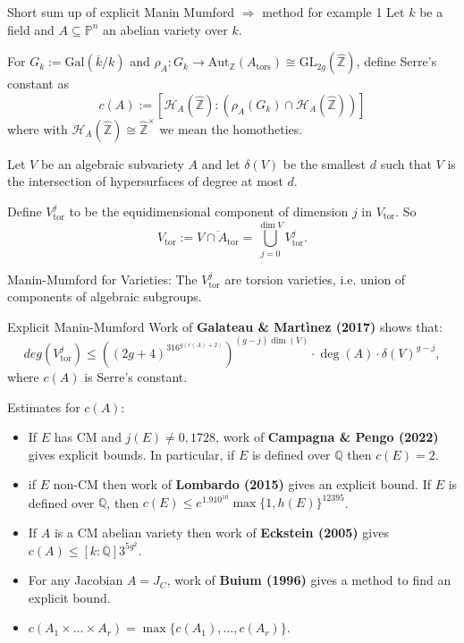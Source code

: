 \documentclass[12pt]{beamer}
\begin{document}
\begin{frame}{Short sum up of explicit Manin Mumford $\Longrightarrow$ method for example 1}
Let $k$ be a field and $A \subseteq \mathbb{P}^n$ an abelian variety over $k$.

\pause
\vspace{0.5cm}
For $G_k := \mathrm{Gal}(\overline{k}/k)$ and $\rho_A \colon G_k \to \mathrm{Aut}_\mathbb{Z}(A_\text{tors}) \cong \mathrm{GL}_{2 g}(\widehat{\mathbb{Z}})$, define Serre's constant as 
\begin{equation*} \label{eq:Serre_constant}
	c(A) := [\mathcal{H}_A(\widehat{\mathbb{Z}}) \colon (\rho_A(G_k) \cap \mathcal{H}_A(\widehat{\mathbb{Z}}))]
\end{equation*} where with $\mathcal{H}_A(\widehat{\mathbb{Z}}) \cong \widehat{\mathbb{Z}}^\times$ we mean the homotheties.

\pause
\vspace{0.5cm}
  Let  $V$ be an algebraic subvariety $A$ and let
 $\delta(V)$  be the smallest $d$ such that $V$ is the intersection of hypersurfaces of degree at most $d$. 
 
 Define $V^j_\text{tor}$ to be  the equidimensional component of dimension $j$ in $V_\text{tor}$. So
 $$V_\text{tor} := \overline{V \cap A_{\text{tor}}} = \bigcup_{j=0}^{\dim V} V_{\text{tor}}^j.$$
 
 Manin-Mumford for Varieties: The $V_{\text{tor}}^j$ are torsion varieties, i.e.  union of components of algebraic subgroups. 
\end{frame}


\begin{frame}{ Explicit Manin-Mumford}
 Work of \textbf{Galateau \& Mart\`inez (2017)} shows that:
  $$ deg(V_{\text{tor}}^j) \le ((2g+4)^316^{g (c(A) + 2)})^{(g-j) \dim(V)} \cdot \deg(A) \cdot \delta(V)^{g-j},$$ where $c(A)$ is Serre's constant.

\pause
\vspace{0.5cm}
Estimates for $c(A)$:
\begin{itemize}
\item If $E$ has CM and $j(E) \neq 0,1728$, work of \textbf{Campagna \& Pengo (2022)} gives explicit bounds. \newline In particular, if $E$ is defined over $\mathbb{Q}$ then
 $c(E)= 2$. 
\item if $E$ non-CM then work of \textbf{Lombardo (2015)} gives an explicit bound. \newline If $E$ is defined over $\mathbb{Q}$, then
$c(E) \le e^{1.9 10^{10}} \max\{1,h(E)\}^{12395}$.\pause
\item If $A$ is a CM abelian variety then work of \textbf{Eckstein (2005)} gives  $c(A)\le [k: \mathbb{Q}]3^{5g^2}$. \pause 
\item For any Jacobian  $A=J_C$, work of \textbf{Buium (1996)} gives a method to find an explicit bound. \pause
\item $c(A_1 \times \dots \times A_r) = \max\{c(A_1),\dots,c(A_r)\}$.
\end{itemize}


\end{frame}
\end{document}
